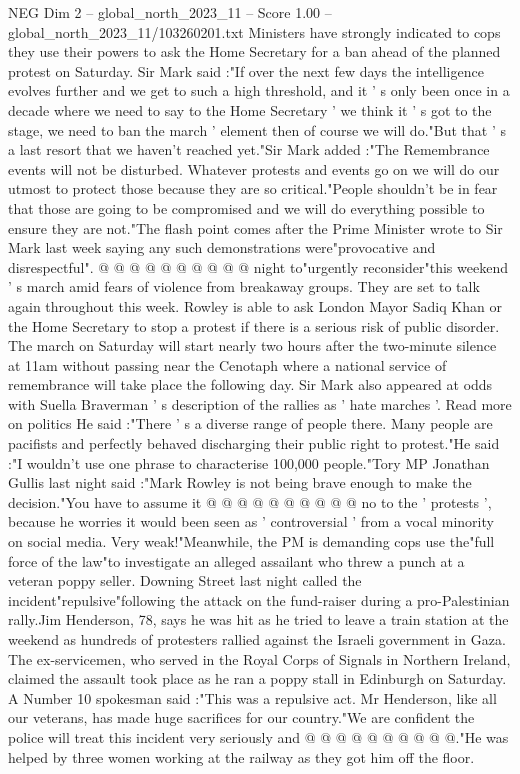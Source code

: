 \begin{textsample}{NEG Dim 2 – global\_north\_2023\_11 – Score 1.00 – global\_north\_2023\_11/103260201.txt}  \label{ex:f2_neg_212}
Ministers have strongly indicated to cops they use their powers to ask the Home Secretary for a ban ahead of the planned protest on Saturday.
Sir Mark said :"If over the next few days the intelligence evolves further and we get to such a high threshold, and it ' s only been once in a decade where we need to say to the Home Secretary ' we think it ' s got to the stage, we need to ban the march ' element then of course we will do."But that ' s a last resort that we haven't reached yet."Sir Mark added :"The Remembrance events will not be disturbed.
Whatever protests and events go on we will do our utmost to protect those because they are so critical."People shouldn't be in fear that those are going to be compromised and we will do everything possible to ensure they are not."The flash point comes after the Prime Minister wrote to Sir Mark last week saying any such demonstrations were"provocative and disrespectful". @ @ @ @ @ @ @ @ @ @ night to"urgently reconsider"this weekend ' s march amid fears of violence from breakaway groups.
They are set to talk again throughout this week.
Rowley is able to ask London Mayor Sadiq Khan or the Home Secretary to stop a protest if there is a serious risk of public disorder.
The march on Saturday will start nearly two hours after the two-minute silence at 11am without passing near the Cenotaph where a national service of remembrance will take place the following day.
Sir Mark also appeared at odds with Suella Braverman ' s description of the rallies as ' hate marches '.
Read more on politics He said :"There ' s a diverse range of people there.
Many people are pacifists and perfectly behaved discharging their public right to protest."He said :"I wouldn't use one phrase to characterise 100,000 people."Tory MP Jonathan Gullis last night said :"Mark Rowley is not being brave enough to make the decision."You have to assume it @ @ @ @ @ @ @ @ @ @ no to the ' protests ', because he worries it would been seen as ' controversial ' from a vocal minority on social media.
Very weak!"Meanwhile, the PM is demanding cops use the"full force of the law"to investigate an alleged assailant who threw a punch at a veteran poppy seller.
Downing Street last night called the incident"repulsive"following the attack on the fund-raiser during a pro-Palestinian rally.Jim Henderson, 78, says he was hit as he tried to leave a train station at the weekend as hundreds of protesters rallied against the Israeli government in Gaza.
The ex-servicemen, who served in the Royal Corps of Signals in Northern Ireland, claimed the assault took place as he ran a poppy stall in Edinburgh on Saturday.
A Number 10 spokesman said :"This was a repulsive act.
Mr Henderson, like all our veterans, has made huge sacrifices for our country."We are confident the police will treat this incident very seriously and @ @ @ @ @ @ @ @ @ @."He was helped by three women working at the railway as they got him off the floor.

\end{textsample}
